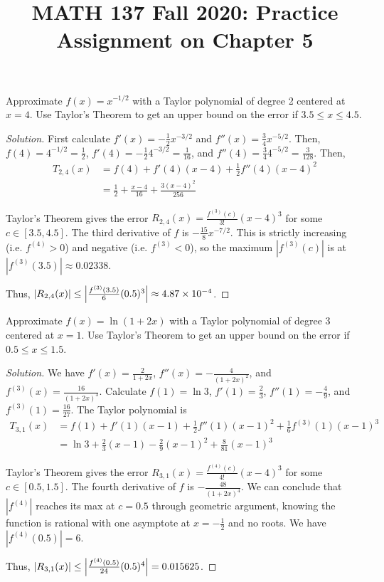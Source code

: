 \documentclass{agony}
\title{MATH 137 Fall 2020: Practice Assignment on Chapter 5}
\begin{document}
\thispagestyle{firstpage}
\textbf{\thetitle}

\question Approximate $f(x)=x^{-1/2}$ with a Taylor polynomial of degree 2 centered at $x=4$.
Use Taylor's Theorem to get an upper bound on the error if $3.5 \leq x \leq 4.5$.
\begin{proof}[Solution]
  First calculate $f'(x) = -\frac12 x^{-3/2}$ and $f''(x) = \frac34 x^{-5/2}$.
  Then, $f(4) = 4^{-1/2} = \frac12$, $f'(4) = -\frac12 4^{-3/2} = \frac{1}{16}$,
  and $f''(4) = \frac34 4^{-5/2} = \frac{3}{128}$. Then,
  \begin{align*}
    T_{2,4}(x) & = f(4) + f'(4)(x-4) + \frac12 f''(4)(x-4)^2       \\
               & = \frac12 + \frac{x-4}{16} + \frac{3(x-4)^2}{256}
  \end{align*}

  Taylor's Theorem gives the error $R_{2,4}(x)=\frac{f^{(3)}(c)}{3!}(x-4)^3$ for some $c\in[3.5,4.5]$.
  The third derivative of $f$ is $-\frac{15}{8} x^{-7/2}$.
  This is strictly increasing (i.e. $f^{(4)} > 0$) and negative (i.e. $f^{(3)} < 0$),
  so the maximum $|f^{(3)}(c)|$ is at $|f^{(3)}(3.5)| \approx 0.02338$.

  Thus, $|R_{2,4}(x)| \leq \abs{\frac{f^{(3)}(3.5)}{6}(0.5)^3} \approx 4.87 \times 10^{-4}$.
\end{proof}


\question Approximate $f(x)=\ln(1+2x)$ with a Taylor polynomial of degree 3 centered at $x=1$.
Use Taylor's Theorem to get an upper bound on the error if $0.5 \leq x \leq 1.5$.
\begin{proof}[Solution]
  We have $f'(x)=\frac{2}{1+2x}$, $f''(x)=-\frac{4}{(1+2x)^2}$, and $f^{(3)}(x)=\frac{16}{(1+2x)^3}$.
  Calculate $f(1)=\ln 3$, $f'(1)=\frac{2}{3}$, $f''(1)=-\frac{4}{9}$, and $f^{(3)}(1)=\frac{16}{27}$.
  The Taylor polynomial is
  \begin{align*}
    T_{3,1}(x) & = f(1) + f'(1)(x-1) + \frac12 f''(1)(x-1)^2 + \frac16 f^{(3)}(1)(x-1)^3 \\
               & = \ln 3 + \frac{2}{3}(x-1) - \frac{2}{9}(x-1)^2 + \frac{8}{81}(x-1)^3
  \end{align*}

  Taylor's Theorem gives the error $R_{3,1}(x)=\frac{f^{(4)}(c)}{4!}(x-4)^3$ for some $c\in[0.5,1.5]$.
  The fourth derivative of $f$ is $-\frac{48}{(1+2x)^4}$.
  We can conclude that $|f^{(4)}|$ reaches its max at $c=0.5$ through geometric argument,
  knowing the function is rational with one asymptote at $x=-\frac12$ and no roots.
  We have $|f^{(4)}(0.5)| = 6$.

  Thus, $|R_{3,1}(x)| \leq \abs{\frac{f^{(4)}(0.5)}{24}(0.5)^4} = 0.015625$.
\end{proof}
\end{document}
